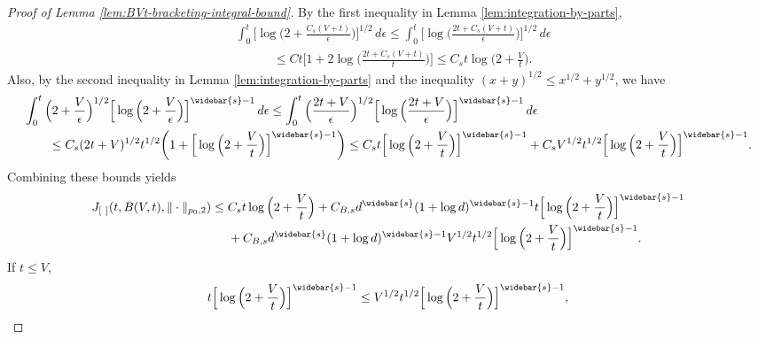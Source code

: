 \documentclass[10pt]{article}
\begin{document}
\begin{proof}[Proof of Lemma \ref{lem:BVt-bracketing-integral-bound}]
By the first inequality in Lemma \ref{lem:integration-by-parts}, 
\begin{equation*}
\begin{aligned}
    &\int_{0}^{t} \Big[\log\Big(2 
    + \frac{C_s(V + t)}{\epsilon}\Big)\Big]^{1/2} \, d\epsilon 
    \le \int_{0}^{t} \Big[\log\Big( 
    \frac{2t + C_s(V + t)}{\epsilon}\Big)\Big]^{1/2} \, d\epsilon \\ 
    &\qquad \quad \le Ct \Big[1 + 2\log\Big(\frac{2t + C_s(V + t)}{t}\Big)\Big]
    \le C_s t \log\Big(2 + \frac{V}{t}\Big).
\end{aligned}
\end{equation*}
Also, by the second inequality in Lemma \ref{lem:integration-by-parts} and the 
inequality $(x + y)^{1/2} \le x^{1/2} + y^{1/2}$, we have 
\begin{equation*}
\begin{aligned}
    &\int_{0}^{t} \Big(2 + \frac{V}{\epsilon}\Big)^{1/2}
    \Big[\log\Big(2 + \frac{V}{\epsilon}\Big)\Big]^{\widebar{s} - 1} \, d\epsilon 
    \le \int_{0}^{t} \Big(\frac{2t + V}{\epsilon}\Big)^{1/2}
    \Big[\log\Big(\frac{2t + V}{\epsilon}\Big)\Big]^{\widebar{s} - 1} \, d\epsilon \\
    &\qquad \le C_s (2t + V)^{1/2}t^{1/2} 
    \bigg(1 + \Big[\log\Big(2 + \frac{V}{t}\Big)\Big]^{\widebar{s} - 1}\bigg) 
    \le C_s t \Big[\log\Big(2 + \frac{V}{t}\Big)\Big]^{\widebar{s} - 1} 
    + C_s V^{1/2}t^{1/2} \Big[\log\Big(2 + \frac{V}{t}\Big)\Big]^{\widebar{s} - 1}. 
\end{aligned}
\end{equation*}
Combining these bounds yields
\begin{equation*}
\begin{aligned}
    &J_{[ \ ]}(t, B(V, t), \| \cdot \|_{p_0, 2}) 
    \le C_s t \log\Big(2 + \frac{V}{t}\Big)
    + C_{B, s} d^{\widebar{s}}(1 + \log d)^{\widebar{s} - 1} 
    t \Big[\log\Big(2 + \frac{V}{t}\Big)\Big]^{\widebar{s} - 1} \\
    &\qquad \qquad \qquad \qquad \qquad \quad
    + C_{B, s} d^{\widebar{s}}(1 + \log d)^{\widebar{s} - 1} 
    V^{1/2}t^{1/2} \Big[\log\Big(2 + \frac{V}{t}\Big)\Big]^{\widebar{s} - 1}.
\end{aligned}
\end{equation*}
If $t \le V$, 
\begin{equation*}
    t \Big[\log\Big(2 + \frac{V}{t}\Big)\Big]^{\widebar{s} - 1}
    \le V^{1/2} t^{1/2} 
    \Big[\log\Big(2 + \frac{V}{t}\Big)\Big]^{\widebar{s} - 1},
\end{equation*}

\end{proof}
\end{document}
